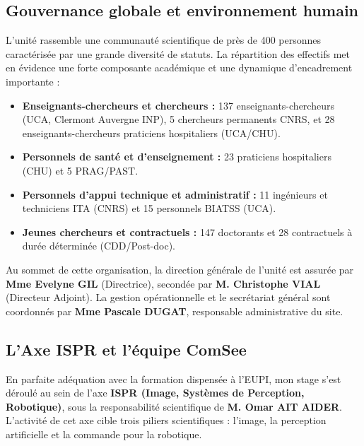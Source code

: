 \documentclass[12pt,a4paper,oneside]{report}
\begin{document}
\subsection{Gouvernance globale et environnement humain}
L'unité rassemble une communauté scientifique de près de 400 personnes caractérisée par une grande diversité de statuts. La répartition des effectifs met en évidence une forte composante académique et une dynamique d'encadrement importante :
\begin{itemize}[label=\textbullet]
    \item \textbf{Enseignants-chercheurs et chercheurs :} 137 enseignants-chercheurs (UCA, Clermont Auvergne INP), 5 chercheurs permanents CNRS, et 28 enseignants-chercheurs praticiens hospitaliers (UCA/CHU).
    \item \textbf{Personnels de santé et d'enseignement :} 23 praticiens hospitaliers (CHU) et 5 PRAG/PAST.
    \item \textbf{Personnels d'appui technique et administratif :} 11 ingénieurs et techniciens ITA (CNRS) et 15 personnels BIATSS (UCA).
    \item \textbf{Jeunes chercheurs et contractuels :} 147 doctorants et 28 contractuels à durée déterminée (CDD/Post-doc).
\end{itemize}

Au sommet de cette organisation, la direction générale de l'unité est assurée par \textbf{Mme Evelyne GIL} (Directrice), secondée par \textbf{M. Christophe VIAL} (Directeur Adjoint). La gestion opérationnelle et le secrétariat général sont coordonnés par \textbf{Mme Pascale DUGAT}, responsable administrative du site.

\subsection{L'Axe ISPR et l'équipe ComSee}

En parfaite adéquation avec la formation dispensée à l'EUPI, mon stage s'est déroulé au sein de l'axe \textbf{ISPR (Image, Systèmes de Perception, Robotique)}, sous la responsabilité scientifique de \textbf{M. Omar AIT AIDER}. L'activité de cet axe cible trois piliers scientifiques : l'image, la perception artificielle et la commande pour la robotique. 
\end{document}
